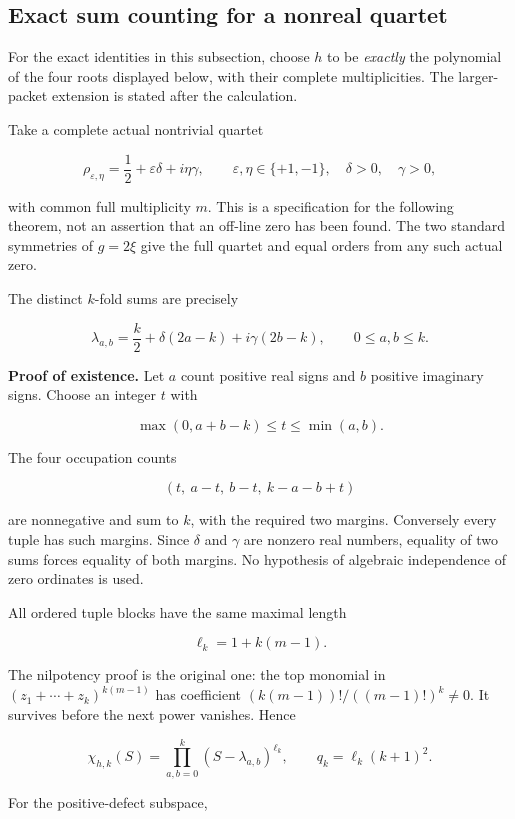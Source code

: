 \subsection{Exact sum counting for a nonreal
quartet}\label{exttrace-exact-sum-counting-for-a-nonreal-quartet}

For the exact identities in this subsection, choose \(h\) to be
\emph{exactly} the polynomial of the four roots displayed below, with
their complete multiplicities. The larger-packet extension is stated
after the calculation.

Take a complete actual nontrivial quartet

\[
\rho_{\varepsilon,\eta}
=\frac12+\varepsilon\delta+i\eta\gamma,
\qquad \varepsilon,\eta\in\{+1,-1\},\quad
\delta>0,\quad\gamma>0,
\]

with common full multiplicity \(m\). This is a specification for the
following theorem, not an assertion that an off-line zero has been
found. The two standard symmetries of \(g=2\xi\) give the full quartet
and equal orders from any such actual zero.

The distinct \(k\)-fold sums are precisely

\[
\boxed{
\lambda_{a,b}
=\frac k2+\delta(2a-k)+i\gamma(2b-k),
\qquad 0\leq a,b\leq k.
}
\]

\textbf{Proof of existence.} Let \(a\) count positive real signs and
\(b\) positive imaginary signs. Choose an integer \(t\) with

\[
\max(0,a+b-k)\leq t\leq\min(a,b).
\]

The four occupation counts

\[
(t,\ a-t,\ b-t,\ k-a-b+t)
\]

are nonnegative and sum to \(k\), with the required two margins.
Conversely every tuple has such margins. Since \(\delta\) and \(\gamma\)
are nonzero real numbers, equality of two sums forces equality of both
margins. No hypothesis of algebraic independence of zero ordinates is
used.

All ordered tuple blocks have the same maximal length

\[
\ell_k=1+k(m-1).
\]

The nilpotency proof is the original one: the top monomial in
\((z_1+\cdots+z_k)^{k(m-1)}\) has coefficient
\((k(m-1))!/((m-1)!)^k\ne0\). It survives before the next power
vanishes. Hence

\[
\boxed{
\chi_{h,k}(S)=\prod_{a,b=0}^k(S-\lambda_{a,b})^{\ell_k},
\qquad q_k=\ell_k(k+1)^2.
}
\]

For the positive-defect subspace,

